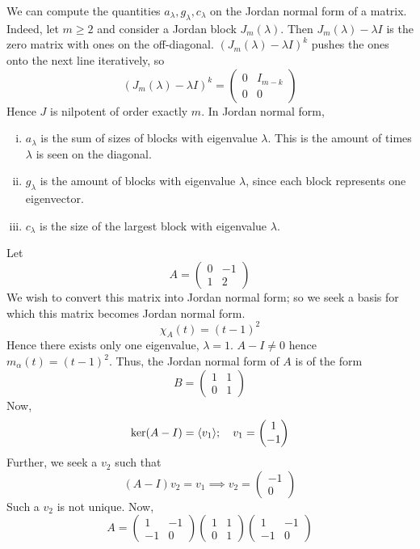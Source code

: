 \begin{remark}
	We can compute the quantities \( a_\lambda, g_\lambda, c_\lambda \) on the Jordan normal form of a matrix.
	Indeed, let \( m \geq 2 \) and consider a Jordan block \( J_m(\lambda) \).
	Then \( J_m(\lambda) - \lambda I \) is the zero matrix with ones on the off-diagonal.
	\( (J_m(\lambda) - \lambda I)^k \) pushes the ones onto the next line iteratively, so
	\[
		(J_m(\lambda) - \lambda I)^k = \begin{pmatrix}
			0 & I_{m-k} \\
			0 & 0
		\end{pmatrix}
	\]
	Hence \( J \) is nilpotent of order exactly \( m \).
	In Jordan normal form,
	\begin{enumerate}[(i)]
		\item \( a_\lambda \) is the sum of sizes of blocks with eigenvalue \( \lambda \).
		      This is the amount of times \( \lambda \) is seen on the diagonal.
		\item \( g_\lambda \) is the amount of blocks with eigenvalue \( \lambda \), since each block represents one eigenvector.
		\item \( c_\lambda \) is the size of the largest block with eigenvalue \( \lambda \).
	\end{enumerate}
\end{remark}
\begin{example}
	Let
	\[
		A = \begin{pmatrix}
			0 & -1 \\
			1 & 2
		\end{pmatrix}
	\]
	We wish to convert this matrix into Jordan normal form; so we seek a basis for which this matrix becomes Jordan normal form.
	\[
		\chi_A(t) = (t-1)^2
	\]
	Hence there exists only one eigenvalue, \( \lambda = 1 \).
	\( A - I \neq 0 \) hence \( m_\alpha(t) = (t-1)^2 \).
	Thus, the Jordan normal form of \( A \) is of the form
	\[
		B = \begin{pmatrix}
			1 & 1 \\
			0 & 1
		\end{pmatrix}
	\]
	Now,
	\[
		\ker(A - I) = \langle{} v_1 \rangle;\quad v_1 = \begin{pmatrix}
			1 \\ -1
		\end{pmatrix}
	\]
	Further, we seek a \( v_2 \) such that
	\[
		(A - I)v_2 = v_1 \implies v_2 = \begin{pmatrix}
			-1 \\ 0
		\end{pmatrix}
	\]
	Such a \( v_2 \) is not unique.
	Now,
	\[
		A = \begin{pmatrix}
			1  & -1 \\
			-1 & 0
		\end{pmatrix}
		\begin{pmatrix}
			1 & 1 \\
			0 & 1
		\end{pmatrix}
		\begin{pmatrix}
			1  & -1 \\
			-1 & 0
		\end{pmatrix}
	\]
\end{example}
